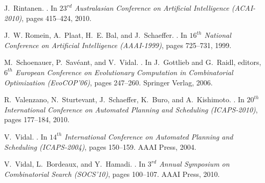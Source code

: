 \documentclass{sig-alternate}
\begin{document}
\begin{thebibliography}{10}
J.~Rintanen.
.
\newblock In {\em $23^{rd}$ Australasian Conference on Artificial Intelligence
  (ACAI-2010)}, pages 415--424, 2010.

J.~W. Romein, A.~Plaat, H.~E. Bal, and J.~Schaeffer.
.
\newblock In {\em $16^{th}$ National Conference on Artificial Intelligence
  (AAAI-1999)}, pages 725--731, 1999.

M.~Schoenauer, P.~Sav\'eant, and V.~Vidal.
.
\newblock In J.~Gottlieb and G.~Raidl, editors, {\em $6^{th}$ European
  Conference on Evolutionary Computation in Combinatorial Optimization
  (EvoCOP'06)}, pages 247--260. Springer Verlag, 2006.

R.~Valenzano, N.~Sturtevant, J.~Schaeffer, K.~Buro, and A.~Kishimoto.
.
\newblock In {\em $20^{th}$ International Conference on Automated Planning and
  Scheduling (ICAPS-2010)}, pages 177--184, 2010.

V.~Vidal.
.
\newblock In {\em $14^{th}$ International Conference on Automated Planning and
  Scheduling (ICAPS-2004)}, pages 150--159. AAAI Press, 2004.

V.~Vidal, L.~Bordeaux, and Y.~Hamadi.
.
\newblock In {\em $3^{rd}$ Annual Symposium on Combinatorial Search (SOCS'10)},
  pages 100--107. AAAI Press, 2010.

\end{thebibliography}
\end{document}
